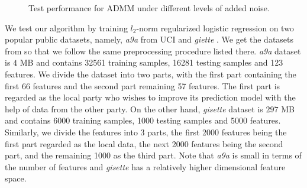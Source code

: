 \begin{figure}[t]
    \centering
    \caption{Test performance for ADMM under different levels of added noise.}
    \label{fig:loss_vs_noise}
     \vspace{-4mm}
\end{figure}

We test our algorithm by training $l_2$-norm regularized logistic regression on two popular public datasets, namely, \emph{a9a} from UCI \cite{Dua:2019} and \emph{giette} \cite{guyon2005result}. We get the datasets from \cite{Liblinear:2019} so that we follow the same preprocessing procedure listed there. \emph{a9a} dataset is $4$ MB and contains 32561 training samples, 16281 testing samples and 123 features. We divide the dataset into two parts, with the first part containing the first 66 features and the second part remaining 57 features. The first part is regarded as the local party who wishes to improve its prediction model with the help of data from the other party. On the other hand, \emph{gisette} dataset is $297$ MB and contains 6000 training samples, 1000 testing samples and 5000 features. Similarly, we divide the features into 3 parts, the first 2000 features being the first part regarded as the local data, the next 2000 features being the second part, and the remaining 1000 as the third part. Note that \emph{a9a} is small in terms of the number of features and \emph{gisette} has a relatively higher dimensional feature space.

